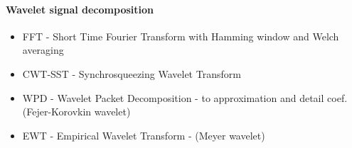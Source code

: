 \paragraph{Wavelet signal decomposition}
\cite{song_mfbd_2021}
\begin{itemize}
\item FFT - Short Time Fourier Transform with Hamming window and Welch averaging

\item CWT-SST - Synchrosqueezing Wavelet Transform
	\cite{arts_fast_2022}
	\cite{yu_concentrated_2020}
	\cite{herrera_applications_2014}

\item WPD - Wavelet Packet Decomposition  - to approximation and detail coef. (Fejer-Korovkin wavelet)
	\cite{yen_wavelet_2000}
	\cite{wickmann_wavelet_2007}

\item EWT - Empirical Wavelet Transform - (Meyer wavelet)
	\cite{wang_computational_2014}
	\cite{tiwari_novel_2021}
	\cite{song_mfbd_2021}
	\cite{li_fault_2019}
	\cite{zhuang_improved_2020}
	\cite{yonggang_time_2020}
	\cite{xu_adaptive_2019}
	\cite{ni_improved_2022}
\end{itemize}


